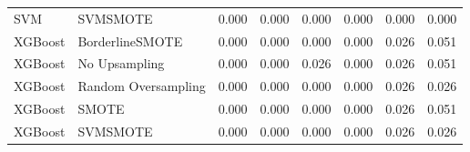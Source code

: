 \begin{tabular}{llllllll}
                            SVM &                      SVMSMOTE & 0.000 &                     0.000 &                 0.000 &                  0.000 &                                   0.000 &    0.000 \\
                        XGBoost &               BorderlineSMOTE & 0.000 &                     0.000 &                 0.000 &                  0.000 &                                   0.026 &    0.051 \\
                        XGBoost &                 No Upsampling & 0.000 &                     0.000 &                 0.026 &                  0.000 &                                   0.026 &    0.051 \\
                        XGBoost &           Random Oversampling & 0.000 &                     0.000 &                 0.000 &                  0.000 &                                   0.026 &    0.026 \\
                        XGBoost &                         SMOTE & 0.000 &                     0.000 &                 0.000 &                  0.000 &                                   0.026 &    0.051 \\
                        XGBoost &                      SVMSMOTE & 0.000 &                     0.000 &                 0.000 &                  0.000 &                                   0.026 &    0.026 \\
\bottomrule
\end{tabular}
